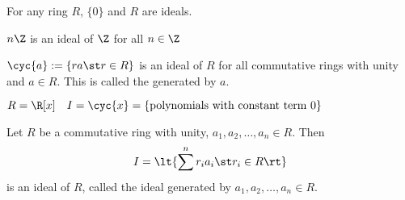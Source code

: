 \begin{example}
  For any ring \( R \), \( \{0\} \) and \( R \) are ideals.
\end{example}

\begin{example}
  \( n\Z \) is an ideal of \( \Z \) for all \( n\in\Z \)
\end{example}

\begin{example}
  \( \cyc{a}:=\{ra\st r\in R\} \) is an ideal of \( R \) for all commutative rings with unity and \( a\in R \). This is called the  generated by \( a \).
\end{example}

\begin{example}
  \( R=\R[x]\quad I=\cyc{x}= \{\text{polynomials with constant term 0}\} \)
\end{example}

\begin{example}
  Let \( R \) be a commutative ring with unity, \( a_1,a_2,\ldots,a_n\in R \). Then
  \begin{align*}
    I = \lt\{\sum^n  r_ia_i \st r_i\in R\rt\}
  \end{align*}
  is an ideal of \( R \), called the ideal generated by \( a_1,a_2,\ldots,a_n\in R \).
\end{example}
